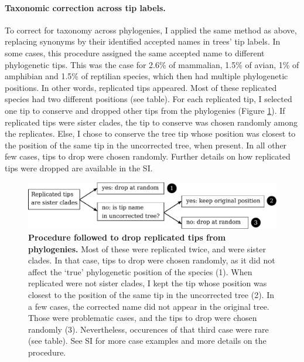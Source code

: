 \paragraph{Taxonomic correction across tip labels.} 
To correct for taxonomy across phylogenies, I applied the same method as above, replacing synonyms by their identified accepted names in trees' tip labels. In some cases, this procedure assigned the same accepted name to different phylogenetic tips. This was the case for 2.6\% of mammalian, 1.5\% of avian, 1\% of amphibian and  1.5\% of reptilian species, which then had multiple phylogenetic positions. In other words, replicated tips appeared. Most of these replicated species had two different positions (see table). For each replicated tip, I selected one tip to conserve and dropped other tips from the phylogenies (Figure \ref{chart_phylorep}). If replicated tips were sister clades, the tip to conserve was chosen randomly among the replicates. Else, I chose to conserve the tree tip whose position was closest to the position of the same tip in the uncorrected tree, when present. In all other few cases, tips to drop were chosen randomly. Further details on how replicated tips were dropped are available in the SI.
\vspace{0.5cm}
\begin{figure}[h!]
\centering
\includegraphics[scale=0.7]{figures/chapter2/chart_phylorep}
\caption[Procedure followed to drop replicated tips from phylogenies]{\textbf{Procedure followed to drop replicated tips from phylogenies.} Most of these were replicated twice, and were sister clades. In that case, tips to drop were chosen randomly, as it did not affect the `true' phylogenetic position of the species (1). When replicated were not sister clades, I kept the tip whose position was closest to the position of the same tip in the uncorrected tree (2). In a few cases, the corrected name did not appear in the original tree. Those were problematic cases, and the tips to drop were chosen randomly (3). Nevertheless, occurences of that third case were rare (see table). See SI for more case examples and more details on the procedure.}
\label{chart_phylorep}
\end{figure}


